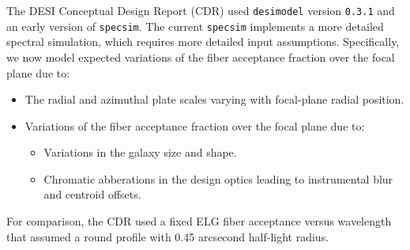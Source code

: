 \documentclass[12pt]{article}
\begin{document}
The DESI Conceptual Design Report (CDR) used {\tt desimodel} version {\tt 0.3.1} and an early version of {\tt specsim}.
The current {\tt specsim} implements a more detailed spectral simulation, which requires more detailed input assumptions.
Specifically, we now model expected variations of the fiber acceptance fraction over the focal plane due to:
\begin{itemize}
    \item The radial and azimuthal plate scales varying with focal-plane radial position.
    \item Variations of the fiber acceptance fraction over the focal plane due to:
    \begin{itemize}
        \item Variations in the galaxy size and shape.
        \item Chromatic abberations in the design optics leading to instrumental blur and centroid offsets.
    \end{itemize}
\end{itemize}
For comparison, the CDR used a fixed ELG fiber acceptance versus wavelength that assumed a round profile
with 0.45 arcsecond half-light radius.



\end{document}
